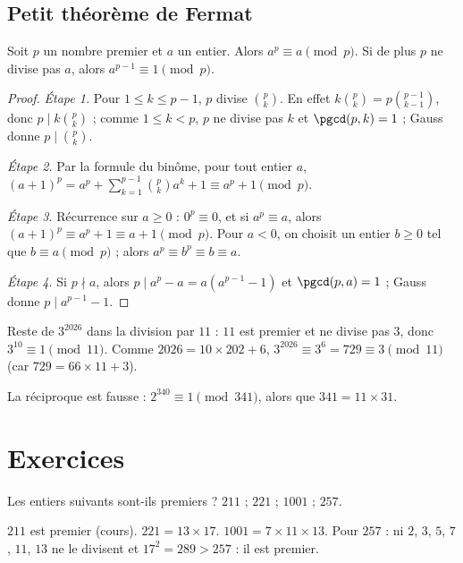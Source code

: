 \subsection{Petit théorème de Fermat}
\begin{theorem}
Soit $p$ un nombre premier et $a$ un entier. Alors $a^p\equiv a\pmod p$. Si de plus $p$ ne divise pas $a$, alors $a^{p-1}\equiv1\pmod p$.
\end{theorem}
\begin{proof}
\emph{Étape 1.} Pour $1\le k\le p-1$, $p$ divise $\binom pk$. En effet $k\binom pk=p\binom{p-1}{k-1}$, donc $p\mid k\binom pk$ ; comme $1\le k<p$, $p$ ne divise pas $k$ et $\pgcd(p,k)=1$ ; Gauss donne $p\mid\binom pk$.\par
\emph{Étape 2.} Par la formule du binôme, pour tout entier $a$, $(a+1)^p=a^p+\sum_{k=1}^{p-1}\binom pk a^k+1\equiv a^p+1\pmod p$.\par
\emph{Étape 3.} Récurrence sur $a\ge0$ : $0^p\equiv0$, et si $a^p\equiv a$, alors $(a+1)^p\equiv a^p+1\equiv a+1\pmod p$. Pour $a<0$, on choisit un entier $b\ge0$ tel que $b\equiv a\pmod p$ ; alors $a^p\equiv b^p\equiv b\equiv a$.\par
\emph{Étape 4.} Si $p\nmid a$, alors $p\mid a^p-a=a\left(a^{p-1}-1\right)$ et $\pgcd(p,a)=1$ ; Gauss donne $p\mid a^{p-1}-1$.
\end{proof}
\begin{example}[Un reste]
Reste de $3^{2026}$ dans la division par $11$ : $11$ est premier et ne divise pas $3$, donc $3^{10}\equiv1\pmod{11}$. Comme $\num{2026}=10\times202+6$, $3^{2026}\equiv3^6=729\equiv3\pmod{11}$ (car $729=66\times11+3$).
\end{example}
\begin{pitfall}
La réciproque est fausse : $2^{340}\equiv1\pmod{341}$, alors que $341=11\times31$.
\end{pitfall}

\mxnewpage
\section{Exercices}
\begin{exercise}
Les entiers suivants sont-ils premiers ? $211$ ; $221$ ; $\num{1001}$ ; $257$.
\end{exercise}
\begin{solution}
$211$ est premier (cours). $221=13\times17$. $\num{1001}=7\times11\times13$. Pour $257$ : ni $2$, $3$, $5$, $7$, $11$, $13$ ne le divisent et $17^2=289>257$ : il est premier.
\end{solution}


